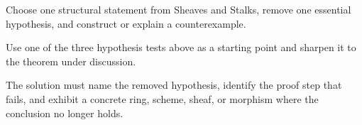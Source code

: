 \begin{exercise}\label{exr:vi13-expand-16}
Choose one structural statement from Sheaves and Stalks, remove one essential hypothesis, and construct or explain a counterexample.
\end{exercise}
\begin{hint}
Use one of the three hypothesis tests above as a starting point and sharpen it to the theorem under discussion.
\end{hint}
\begin{solution}
The solution must name the removed hypothesis, identify the proof step that fails, and exhibit a concrete ring, scheme, sheaf, or morphism where the conclusion no longer holds.
\end{solution}

